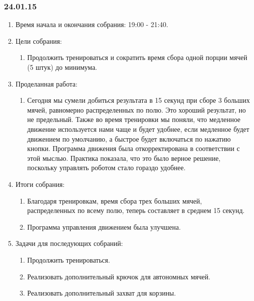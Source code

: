 \subsubsection{24.01.15}
\begin{enumerate}
	
	\item Время начала и окончания собрания: 19:00 - 21:40.
	
	\item Цели собрания: 
	\begin{enumerate}
		
		\item Продолжить тренироваться и сократить время сбора одной порции мячей (5 штук) до минимума.
		
	\end{enumerate}

	\item Проделанная работа:
	\begin{enumerate}
		
		\item Сегодня мы сумели добиться результата в 15 секунд при сборе 3 больших мячей, равномерно распределенных по полю. Это хороший результат, но не предельный. Также во время тренировки мы поняли, что медленное движение используется нами чаще и будет удобнее, если медленное будет движением по умолчанию, а быстрое будет включаться по нажатию кнопки. Программа движения была откорректирована в соответствии с этой мыслью. Практика показала, что это было верное решение, поскольку управлять роботом стало гораздо удобнее.
		
	\end{enumerate}
	
	\item Итоги собрания:
	\begin{enumerate}
		
		\item Благодаря тренировкам, время сбора трех больших мячей, распределенных по всему полю, теперь составляет в среднем 15 секунд.
		
		\item Программа управления движением была улучшена.
		
	\end{enumerate}
	
	\item Задачи для последующих собраний:
	\begin{enumerate}
		
		\item Продолжить тренироваться.
		
		\item Реализовать дополнительный крючок для автономных мячей.
		
		\item Реализовать дополнительный захват для корзины.
			
	\end{enumerate}
\end{enumerate}
\fillpage
